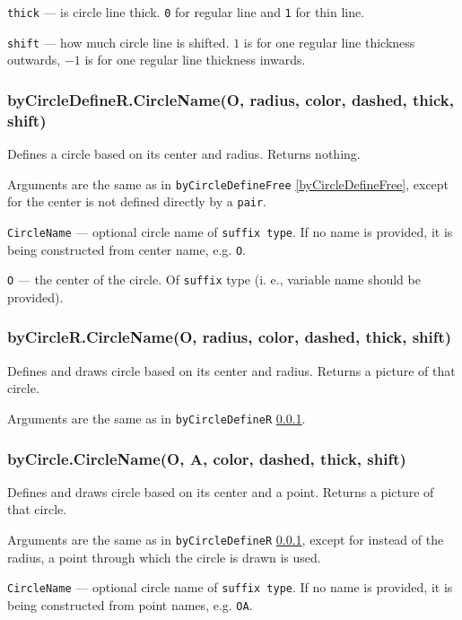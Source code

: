 \documentclass{ltxdoc}
\begin{document}
	\texttt{thick} — is circle line thick. \texttt{0} for regular line and \texttt{1} for thin line.
	
	\texttt{shift} — how much circle line is shifted. \texttt{$1$} is for one regular line thickness outwards, \texttt{$-1$} is for one regular line thickness inwards.

\subsubsection{byCircleDefineR.CircleName(O, radius, color, dashed, thick, shift)}\label{byCircleDefineR}
	
	Defines a circle based on its center and radius. Returns nothing.
	
	Arguments are the same as in \texttt{byCircleDefineFree} \ref{byCircleDefineFree}, except for the center is not defined directly by a \texttt{pair}.
	
	\texttt{CircleName} — optional circle name of \texttt{suffix type}. If no name is provided, it is being constructed from center name, e.g. \texttt{O}.
	
	\texttt{O} — the center of the circle. Of \texttt{suffix} type (i. e., variable name should be provided).

\subsubsection{byCircleR.CircleName(O, radius, color, dashed, thick, shift)}\label{byCircleR}
	
	Defines and draws circle based on its center and radius. Returns a picture of that circle.
	
	Arguments are the same as in \texttt{byCircleDefineR} \ref{byCircleDefineR}.

\subsubsection{byCircle.CircleName(O, A, color, dashed, thick, shift)}\label{byCircle}
	
	Defines and draws circle based on its center and a point. Returns a picture of that circle.
	
	Arguments are the same as in \texttt{byCircleDefineR} \ref{byCircleDefineR}, except for instead of the radius, a point through which the circle is drawn is used.
	
	\texttt{CircleName} — optional circle name of \texttt{suffix type}. If no name is provided, it is being constructed from point names, e.g. \texttt{OA}.
	
\end{document}
